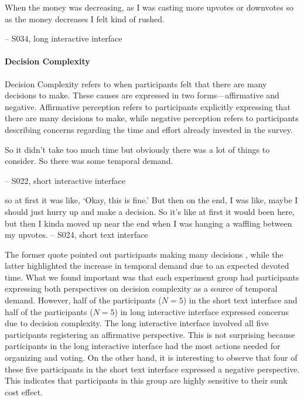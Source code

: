 \begin{displayquote}
When the money was decreasing, as I was casting more upvotes or downvotes so as the money decreases I felt kind of rushed.
            
\noindent \hfill -- S034, long interactive interface
\end{displayquote}

\paragraph{Decision Complexity} Decision Complexity refers to when participants felt that there are many decisions to make. These causes are expressed in two forms—affirmative and negative. Affirmative perception refers to participants explicitly expressing that there are many decisions to make, while negative perception refers to participants describing concerns regarding the time and effort already invested in the survey.

\begin{displayquote}
So it didn't take too much time but obviously there was a lot of things to consider. So there was some temporal demand.
    
\noindent \hfill -- S022, short interactive interface
\end{displayquote}

\begin{displayquote}
\bracketellipsis so at first it was like, `Okay, this is fine.' But then on the end, I was like, maybe I should just hurry up and make a decision. So it's like at first it would been here, but then I kinda moved up near the end when I was hanging a waffling between my upvotes.
\noindent \hfill -- S024, short text interface
\end{displayquote}

The former quote pointed out participants making many decisions , while the latter highlighted the increase in temporal demand due to an expected devoted time. What we found important was that each experiment group had participants expressing both perspectives on decision complexity as a source of temporal demand. However, half of the participants ($N=5$) in the short text interface and half of the participants ($N=5$) in long interactive interface expressed concerns due to decision complexity. The long interactive interface involved all five participants registering an affirmative perspective. This is not surprising because participants in the long interactive interface had the most actions needed for organizing and voting. On the other hand, it is interesting to observe that four of these five participants in the short text interface expressed a negative perspective. This indicates that participants in this group are highly sensitive to their sunk cost effect.

